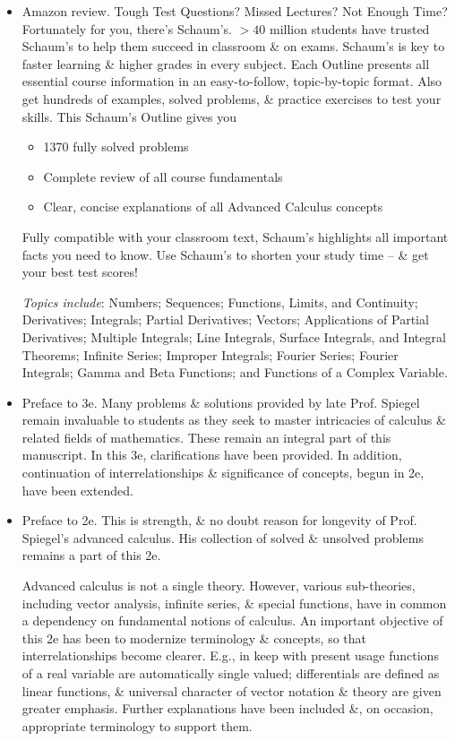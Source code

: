 \documentclass{article}
\begin{document}
\begin{itemize}
	\item {\sf Amazon review.} Tough Test Questions? Missed Lectures? Not Enough Time? Fortunately for you, there's Schaum's. $> 40$ million students have trusted Schaum's to help them succeed in classroom \& on exams. Schaum's is key to faster learning \& higher grades in every subject. Each Outline presents all essential course information in an easy-to-follow, topic-by-topic format. Also get hundreds of examples, solved problems, \& practice exercises to test your skills. This Schaum's Outline gives you
	\begin{itemize}
		\item 1370 fully solved problems
		\item Complete review of all course fundamentals
		\item Clear, concise explanations of all Advanced Calculus concepts
	\end{itemize}
	Fully compatible with your classroom text, Schaum's highlights all important facts you need to know. Use Schaum's to shorten your study time -- \& get your best test scores!
	
	{\it Topics include}: Numbers; Sequences; Functions, Limits, and Continuity; Derivatives; Integrals; Partial Derivatives; Vectors; Applications of Partial Derivatives; Multiple Integrals; Line Integrals, Surface Integrals, and Integral Theorems; Infinite Series; Improper Integrals; Fourier Series; Fourier Integrals; Gamma and Beta Functions; and Functions of a Complex Variable.
	\item {\sf Preface to 3e.} Many problems \& solutions provided by late Prof. {\sc Spiegel} remain invaluable to students as they seek to master intricacies of calculus \& related fields of mathematics. These remain an integral part of this manuscript. In this 3e, clarifications have been provided. In addition, continuation of interrelationships \& significance of concepts, begun in 2e, have been extended.
	\item {\sf Preface to 2e.}  This is strength, \& no doubt reason for longevity of Prof. {\sc Spiegel}'s advanced calculus. His collection of solved \& unsolved problems remains a part of this 2e.
	
	Advanced calculus is not a single theory. However, various sub-theories, including vector analysis, infinite series, \& special functions, have in common a dependency on fundamental notions of calculus. An important objective of this 2e has been to modernize terminology \& concepts, so that interrelationships become clearer. E.g., in keep with present usage functions of a real variable are automatically single valued; differentials are defined as linear functions, \& universal character of vector notation \& theory are given greater emphasis. Further explanations have been included \&, on occasion, appropriate terminology to support them.
	

\end{itemize}
\end{document}
